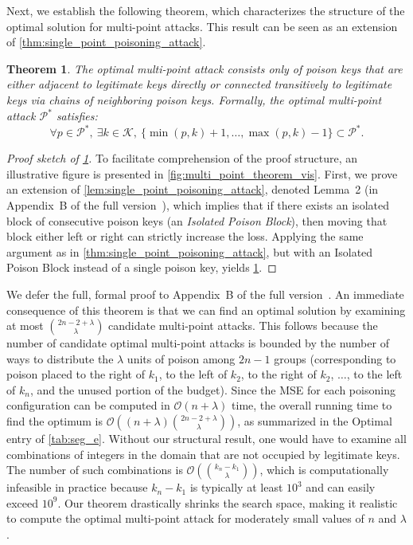 \documentclass[acmsmall]{acmart}
\newtheorem{theorem}{Theorem}
\begin{document}
Next, we establish the following theorem, which characterizes the structure of the optimal solution for multi-point attacks.
This result can be seen as an extension of \cref{thm:single_point_poisoning_attack}.
\begin{theorem_box}
\begin{theorem}
\label{thm:structure_of_optimal_multi_point_attack}
    The optimal multi-point attack consists only of poison keys that are either adjacent to legitimate keys directly or connected transitively to legitimate keys via chains of neighboring poison keys.
    Formally, the optimal multi-point attack $\mathcal{P}^\ast$ satisfies:
    \begin{equation}
        \forall p \in \mathcal{P}^\ast,~ \exists k \in \mathcal{K}, ~ \{\min(p,k)+1, \dots, \max(p,k)-1\} \subset \mathcal{P}^\ast.
    \end{equation}
\end{theorem}
\end{theorem_box}
\begin{proof}[Proof sketch of \cref{thm:structure_of_optimal_multi_point_attack}]
To facilitate comprehension of the proof structure, an illustrative figure is presented in \cref{fig:multi_point_theorem_vis}.
First, we prove an extension of \cref{lem:single_point_poisoning_attack}, denoted Lemma~2 (in Appendix~B of the full version~\cite{sato2026mathematical_arxiv}), which implies that if there exists an isolated block of consecutive poison keys (an \emph{Isolated Poison Block}), then moving that block either left or right can strictly increase the loss.
Applying the same argument as in \cref{thm:single_point_poisoning_attack}, but with an Isolated Poison Block instead of a single poison key, yields \cref{thm:structure_of_optimal_multi_point_attack}.
\end{proof}
We defer the full, formal proof to Appendix~B of the full version~\cite{sato2026mathematical_arxiv}.
An immediate consequence of this theorem is that we can find an optimal solution by examining at most $\binom{2n-2+\lambda}{\lambda}$ candidate multi-point attacks.
This follows because the number of candidate optimal multi-point attacks is bounded by the number of ways to distribute the $\lambda$ units of poison among $2n-1$ groups (corresponding to poison placed to the right of $k_1$, to the left of $k_2$, to the right of $k_2$, $\dots$, to the left of $k_n$, and the unused portion of the budget).
Since the MSE for each poisoning configuration can be computed in $\mathcal{O}(n+\lambda)$ time, the overall running time to find the optimum is $\mathcal{O}\left((n+\lambda)\binom{2n-2+\lambda}{\lambda}\right)$, as summarized in the Optimal entry of \cref{tab:seg_e}.
Without our structural result, one would have to examine all combinations of integers in the domain that are not occupied by legitimate keys.
The number of such combinations is $\mathcal{O}\left(\binom{k_n-k_1}{\lambda}\right)$, which is computationally infeasible in practice because $k_n-k_1$ is typically at least $10^3$ and can easily exceed $10^9$. 
Our theorem drastically shrinks the search space, making it realistic to compute the optimal multi-point attack for moderately small values of $n$ and $\lambda$.
\end{document}

